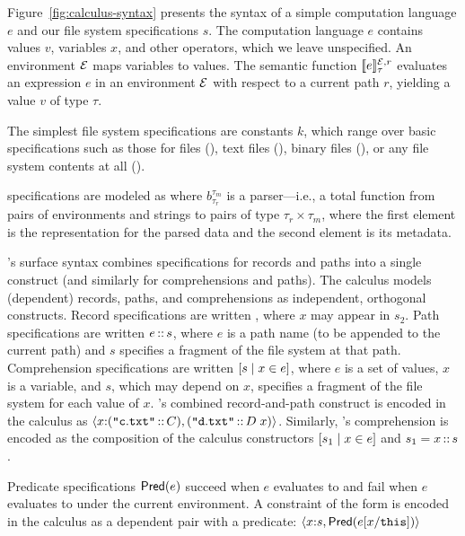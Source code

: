 Figure~\ref{fig:calculus-syntax} presents the syntax of a simple
computation language $e$ and our file system specifications $s$.  The
computation language $e$ contains values $v$, variables $x$, and other
operators, which we leave unspecified.  An environment $\mathcal{E}$ maps
variables to values.  The semantic function $[\![e]\!]^{\mathcal{E},r}_{\tau}$
evaluates an expression $e$ in an environment $\mathcal{E}$ with respect to a
current path $r$, yielding a value $v$ of type $\tau$.

%
The simplest file system specifications are constants $k$, which range
over basic specifications such as those for files (\pfile), text files
(\ptext), binary files (\pbin), or any file system contents at all
(\pany).

\padshaskell{} specifications are modeled as  where
$b^{\tau_m}_{\tau_r}$ is a parser---i.e., a total function from pairs
of environments and strings to pairs of type $\tau_r \times \tau_m$,
where the first element is the representation for the parsed data and
the second element is its metadata.

\forest{}'s surface syntax combines specifications for records and
paths into a single construct (and similarly for comprehensions and
paths). The calculus models (dependent) records, paths, and
comprehensions as independent, orthogonal constructs.  Record
specifications are written , where $x$ may appear
in $s_2$.  Path specifications are written $e\,{::}\,s$, where $e$
is a path name (to be appended to the current path) and $s$ specifies
a fragment of the file system at that path. Comprehension
specifications are written $[ s \mid x \in e ]$, where $e$ is a set of
values, $x$ is a variable, and $s$, which may depend on $x$, specifies
a fragment of the file system for each value of $x$.  \forest{}'s
combined record-and-path construct  is encoded in the calculus as
$\langle x {:} (\texttt{"}\mathtt{c.txt}\texttt{"}\,{::}\,C), (\texttt{"}\mathtt{d.txt}\texttt{"}\,{::}\,D\;
    x) \rangle$.  Similarly, \forest{}'s comprehension \cd{[x :: s | x <-
  e]} is encoded as the composition of the calculus constructors
$[ s_1 \mid x \in e ]$ and $s_1 = x\,{::}\,s$.

Predicate specifications $\mathsf{Pred}(e)$ succeed when $e$ evaluates to
\True{} and fail when $e$ evaluates to \False{} under the current
environment.  A \forest{} constraint of the form  is
encoded in the calculus as a dependent pair with a predicate:
$\langle x {:} s, \mathsf{Pred}(e[x/\mathtt{this}]) \rangle$

